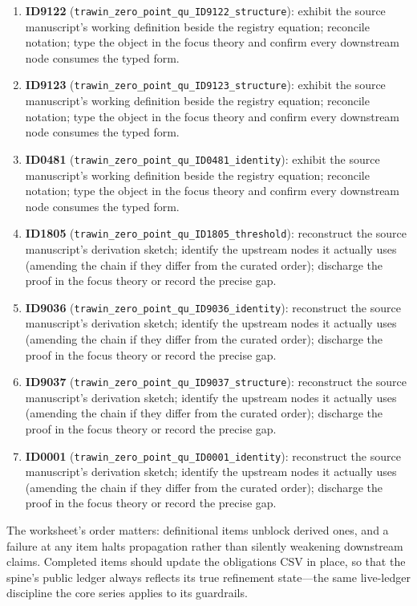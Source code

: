 \documentclass[11pt]{article}
\theoremstyle{remark}
\begin{document}
\begin{enumerate}
\item \textbf{ID9122} (\texttt{trawin\_zero\_point\_qu\_ID9122\_structure}): exhibit the source manuscript's working definition beside the registry equation; reconcile notation; type the object in the focus theory and confirm every downstream node consumes the typed form.
\item \textbf{ID9123} (\texttt{trawin\_zero\_point\_qu\_ID9123\_structure}): exhibit the source manuscript's working definition beside the registry equation; reconcile notation; type the object in the focus theory and confirm every downstream node consumes the typed form.
\item \textbf{ID0481} (\texttt{trawin\_zero\_point\_qu\_ID0481\_identity}): exhibit the source manuscript's working definition beside the registry equation; reconcile notation; type the object in the focus theory and confirm every downstream node consumes the typed form.
\item \textbf{ID1805} (\texttt{trawin\_zero\_point\_qu\_ID1805\_threshold}): reconstruct the source manuscript's derivation sketch; identify the upstream nodes it actually uses (amending the chain if they differ from the curated order); discharge the proof in the focus theory or record the precise gap.
\item \textbf{ID9036} (\texttt{trawin\_zero\_point\_qu\_ID9036\_identity}): reconstruct the source manuscript's derivation sketch; identify the upstream nodes it actually uses (amending the chain if they differ from the curated order); discharge the proof in the focus theory or record the precise gap.
\item \textbf{ID9037} (\texttt{trawin\_zero\_point\_qu\_ID9037\_structure}): reconstruct the source manuscript's derivation sketch; identify the upstream nodes it actually uses (amending the chain if they differ from the curated order); discharge the proof in the focus theory or record the precise gap.
\item \textbf{ID0001} (\texttt{trawin\_zero\_point\_qu\_ID0001\_identity}): reconstruct the source manuscript's derivation sketch; identify the upstream nodes it actually uses (amending the chain if they differ from the curated order); discharge the proof in the focus theory or record the precise gap.
\end{enumerate}

The worksheet's order matters: definitional items unblock derived ones, and a failure at any item halts propagation rather than silently weakening downstream claims. Completed items should update the obligations CSV in place, so that the spine's public ledger always reflects its true refinement state---the same live-ledger discipline the core series applies to its guardrails.
\end{document}
